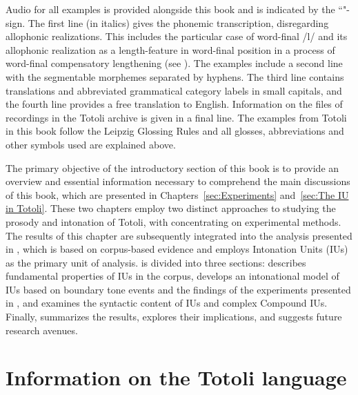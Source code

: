 Audio for all examples is provided alongside this book and is indicated by the ``\triangleright"-sign.   The first line (in italics) gives the phonemic transcription, disregarding allophonic realizations. This includes the particular case of word-final /l/ and its allophonic realization as a length-feature in word-final position in a process of word-final compensatory lengthening (see ). The examples include a second line with the segmentable morphemes separated by hyphens. The third line contains translations and abbreviated grammatical category labels in small capitals, and the fourth line provides a free translation to English. Information on the files of recordings in the Totoli archive \citep{TotoliLAC} is given in a final line. The  examples from Totoli in this book follow the Leipzig Glossing Rules \citep{haspelmath2014leipzig} and all glosses, abbreviations and other symbols used are explained above. 




The primary objective of the introductory section of this book is to provide  an overview and essential information necessary to comprehend the main discussions of this book, which are presented in Chapters~\ref{sec:Experiments} and~\ref{sec:The IU in Totoli}.  These two chapters employ two distinct approaches to studying the prosody and intonation of Totoli, with  concentrating on experimental methods. The results of this chapter are subsequently integrated into the analysis presented in , which is based on corpus-based evidence and employs Intonation Units (IUs) as the primary unit of analysis.  is divided into three sections:   describes fundamental properties of IUs in the corpus,    develops an intonational model of IUs based on boundary tone events and the findings of the experiments presented in , and   examines the syntactic content of IUs and complex Compound IUs. Finally,  summarizes the results, explores their implications, and suggests future research avenues.



\section[The Totoli Language]{Information on the Totoli language}\label{sec:data}

